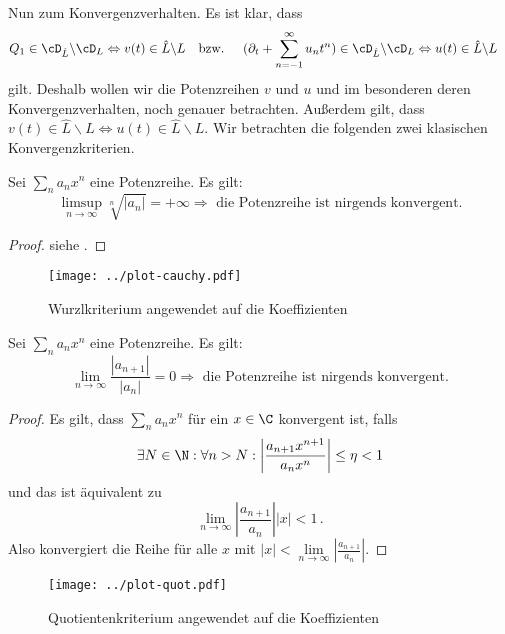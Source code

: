 Nun zum Konvergenzverhalten. Es ist klar, dass
\begin{align*}
Q_1\in\cD_{\hat L} \backslash\cD_L &\Leftrightarrow v(t) \in\hat L \backslash L
&\mbox{bzw. } & &
(\partial_t + \sum_{n=-1}^\infty u_nt^n)\in \cD_{\hat L} \backslash \cD_L
&\Leftrightarrow u(t) \in \hat L \backslash L
\end{align*}
gilt. Deshalb wollen wir die Potenzreihen $v$ und $u$ und im besonderen deren
Konvergenzverhalten, noch genauer betrachten.
Außerdem gilt, dass $ v(t) \in\hat L \backslash L \Leftrightarrow u(t) \in \hat
L \backslash L$.
Wir betrachten die folgenden zwei klasischen Konvergenzkriterien.
\begin{thm} \label{thm:convKrit}
Sei $\sum_n a_n x^n$ eine Potenzreihe. Es gilt:
\[
\underset{n\rightarrow\infty}{\limsup} \sqrt[n]{|a_n|} = +\infty
\Rightarrow \text{ die Potenzreihe ist nirgends konvergent.}
\]
\end{thm}
\begin{proof}
siehe \cite[§18, Satz 94]{KnoppReihen}.
\end{proof}
\begin{figure}[htbp]
  \centering
  \texttt{[image: ../plot-cauchy.pdf]}
  \caption{Wurzlkriterium angewendet auf die Koeffizienten}
  \label{fig:plotCauchyKoeffs}
\end{figure}
\begin{thm}[Quotientenkriterium]
Sei $\sum_n a_n x^n$ eine Potenzreihe. Es gilt:
\[
\underset{n\rightarrow\infty}{\lim} \frac{|a_{n+1}|}{|a_n|} = 0
\Rightarrow \text{ die Potenzreihe ist nirgends konvergent.}
\]
\end{thm}
\begin{proof}
Es gilt, dass $\sum_na_nx^n$ für ein $x\in\C$ konvergent ist, falls
\[
\exists N\in\N:\forall n>N:\left|\frac{a_{n+1}x^{n+1}}{a_nx^n}\right|\leq\eta<1
\]
und das ist äquivalent zu
\[
\underset{n\rightarrow\infty}{\lim} \left|\frac{a_{n+1}}{a_n}\right||x| < 1 \,.
\]
Also konvergiert die Reihe für alle $x$ mit
$|x|<\underset{n\rightarrow\infty}{\lim} \left|\frac{a_{n+1}}{a_n}\right|$.
\end{proof}
\begin{figure}[htbp]
  \centering
  \texttt{[image: ../plot-quot.pdf]}
  \caption{Quotientenkriterium angewendet auf die Koeffizienten}
  \label{fig:plotQuotKoeffs}
\end{figure}

